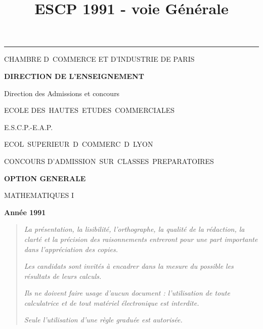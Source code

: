 \documentclass[11pt]{article}%
\title{\bf \vspace{-2cm} ESCP 1991 - voie Générale} %
\author{} %
\date{} %
\begin{document}
\maketitle %
\vspace{-1.4cm}\hrule %
\thispagestyle{fancy}

\vspace*{.2cm}




\begin{center}
{\small CHAMBRE D\E\ COMMERCE ET D'INDUSTRIE DE PARIS}

\textbf{DIRECTION DE L'ENSEIGNEMENT}

Direction des Admissions et concours

\underline{\hspace*{3cm}}

{\Large ECOLE DES\ HAUTES\ ETUDES\ COMMERCIALES}

{\Large E.S.C.P.-E.A.P.}

{\Large ECOL\E\ SUPERIEUR\E\ D\E\ COMMERC\E\ D\E\ LYON}{\large }

CONCOURS D'ADMISSION\ SUR\ CLASSES\ PREPARATOIRES

\underline{\hspace*{3cm}}

\textbf{OPTION GENERALE}

{\Large MATHEMATIQUES I}

\textbf{Année 1991}

\underline{\hspace*{3cm}}
\end{center}

\begin{quotation}
\noindent \textsl{La présentation, la lisibilité, l'orthographe, la
qualité
de la rédaction, la clarté et la précision des raisonnements entreront
pour
une part importante dans l'appréciation des copies.}

\noindent \textsl{Les candidats sont invités à encadrer dans la mesure
du
possible les résultats de leurs calculs.}

\noindent \textsl{Ils ne doivent faire usage d'aucun document :
l'utilisation de toute calculatrice et de tout matériel électronique
est
interdite.}

\noindent \textsl{Seule l'utilisation d'une règle graduée est
autorisée.}

\noindent \textsl{\hrulefill }
\end{quotation}
\end{document}
